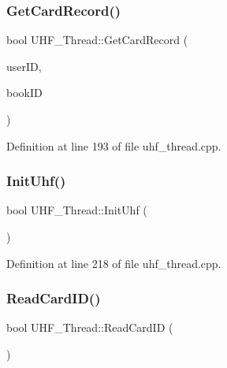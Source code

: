 \mbox{\label{class_u_h_f___thread_af1bc225a4a6a68a1dd79eb7d8688648d}} 
\subsubsection{\texorpdfstring{GetCardRecord()}{GetCardRecord()}}
{\footnotesize\ttfamily bool U\+H\+F\+\_\+\+Thread\+::\+Get\+Card\+Record (\begin{DoxyParamCaption}\item[{Q\+String}]{user\+ID,  }\item[{Q\+String}]{book\+ID }\end{DoxyParamCaption})}



Definition at line 193 of file uhf\+\_\+thread.\+cpp.

\mbox{\label{class_u_h_f___thread_a0bb3c8d9ac1290986ce318819dc4ecbf}} 
\subsubsection{\texorpdfstring{InitUhf()}{InitUhf()}}
{\footnotesize\ttfamily bool U\+H\+F\+\_\+\+Thread\+::\+Init\+Uhf (\begin{DoxyParamCaption}{ }\end{DoxyParamCaption})}



Definition at line 218 of file uhf\+\_\+thread.\+cpp.

\mbox{\label{class_u_h_f___thread_a6dcb8fe026e47d35c7d992b860c86492}} 
\subsubsection{\texorpdfstring{ReadCardID()}{ReadCardID()}}
{\footnotesize\ttfamily bool U\+H\+F\+\_\+\+Thread\+::\+Read\+Card\+ID (\begin{DoxyParamCaption}{ }\end{DoxyParamCaption})}



